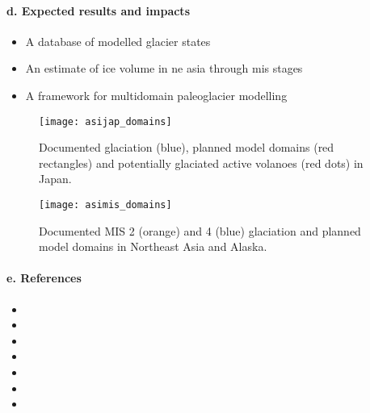 \documentclass{article}
\begin{document}
\paragraph{d. Expected results and impacts}

    \begin{itemize}
      \item{A database of modelled glacier states}
      \item{An estimate of ice volume in ne asia through mis stages}
      \item{A framework for multidomain paleoglacier modelling}
    \end{itemize}

    \begin{figure}
      \centerline{\texttt{[image: asijap\_domains]}}
      \caption{%
        Documented glaciation (blue), planned model domains (red rectangles)
        and potentially glaciated active volanoes (red dots) in Japan.}
      \label{fig:japan}
    \end{figure}

    \begin{figure}
      \centerline{\texttt{[image: asimis\_domains]}}
      \caption{%
        Documented MIS 2 (orange) and 4 (blue) glaciation and planned model
        domains in Northeast Asia and Alaska.}
      \label{fig:asia}
    \end{figure}

\paragraph{e. References}

    \begin{itemize}
      \item{}
      \item{}
      \item{}
      \item{}
      \item{}
      \item{}
      \item{}
    \end{itemize}
\end{document}
